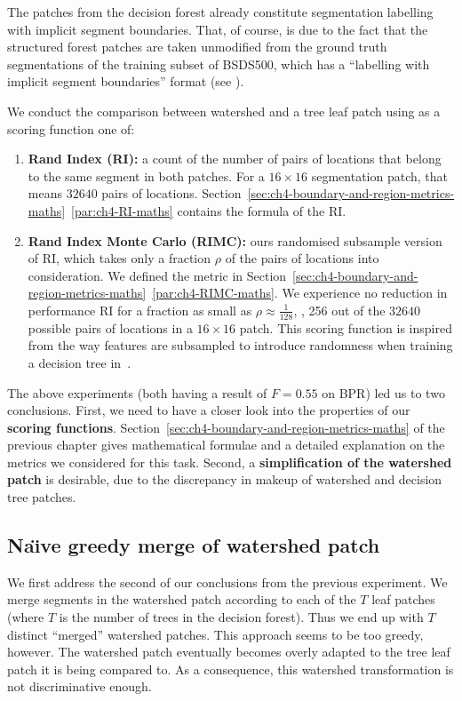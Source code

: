 The patches from the decision forest already constitute segmentation labelling with implicit segment boundaries. That, of course, is due to the fact that the structured forest patches are taken unmodified from the ground truth segmentations of the training subset of BSDS500, which has a ``labelling with implicit segment boundaries'' format (see ). 

We conduct the comparison between watershed and a tree leaf patch using as a scoring function one of:

\begin{enumerate}
 \item{\bf Rand Index (RI):} a count of the number of pairs of locations that belong to the same segment in both patches. For a $16\times16$ segmentation patch, that means $32 640$ pairs of locations. Section~\ref*{sec:ch4-boundary-and-region-metrics-maths}~\ref{par:ch4-RI-maths} contains the formula of the RI.
 \item{\bf Rand Index Monte Carlo (RIMC):} ours randomised subsample version of RI, which takes only a fraction $\rho$ of the pairs of locations into consideration. We defined %
 the metric in Section~\ref*{sec:ch4-boundary-and-region-metrics-maths}~\ref{par:ch4-RIMC-maths}. We experience no reduction in performance \wrt RI for a fraction as small as $\rho\approx\frac{1}{128}$, \ie, 256 out of the $32 640$ possible pairs of locations in a $16 \times 16$ patch. This scoring function is inspired from the way features are subsampled to introduce randomness when training a decision tree in~\cite{DollarICCV13edges,Dollar2013toolbox}.
\end{enumerate}

The above experiments (both having a result of $F=0.55$ on BPR) led us to two conclusions. First, we need to have a closer look into the properties of our \textbf{scoring functions}. Section~\ref{sec:ch4-boundary-and-region-metrics-maths} of the previous chapter gives mathematical formulae and a detailed explanation on the metrics we considered for this task. Second, a \textbf{simplification of the watershed patch} is desirable, due to the discrepancy %
in makeup %
of watershed and decision tree patches.

\subsection{Na\"{\i}ve greedy merge of watershed patch}
We first address the second of our conclusions from the previous experiment. We merge segments in the watershed patch according to each of the $T$ leaf patches (where $T$ is the number of trees in the decision forest). Thus we end up with $T$ distinct ``merged'' watershed patches. This approach seems to be too greedy, however. The watershed patch eventually becomes overly adapted to the tree leaf patch it is being compared to. As a consequence, this watershed transformation is not discriminative enough.


